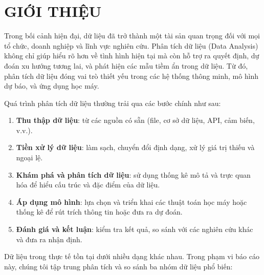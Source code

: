 ﻿\chapter{GIỚI THIỆU}

Trong bối cảnh hiện đại, dữ liệu đã trở thành một tài sản quan trọng đối với mọi tổ chức, doanh nghiệp và lĩnh vực nghiên cứu. Phân tích dữ liệu (Data Analysis) không chỉ giúp hiểu rõ hơn về tình hình hiện tại mà còn hỗ trợ ra quyết định, dự đoán xu hướng tương lai, và phát hiện các mẫu tiềm ẩn trong dữ liệu. Từ đó, phân tích dữ liệu đóng vai trò thiết yếu trong các hệ thống thông minh, mô hình dự báo, và ứng dụng học máy.

Quá trình phân tích dữ liệu thường trải qua các bước chính như sau:

\begin{enumerate}[leftmargin=1.8em,label=\textbf{(\arabic*)}]
    \item \textbf{Thu thập dữ liệu}: từ các nguồn có sẵn (file, cơ sở dữ liệu, API, cảm biến, v.v.).
    \item \textbf{Tiền xử lý dữ liệu}: làm sạch, chuyển đổi định dạng, xử lý giá trị thiếu và ngoại lệ.
    \item \textbf{Khám phá và phân tích dữ liệu}: sử dụng thống kê mô tả và trực quan hóa để hiểu cấu trúc và đặc điểm của dữ liệu.
    \item \textbf{Áp dụng mô hình}: lựa chọn và triển khai các thuật toán học máy hoặc thống kê để rút trích thông tin hoặc đưa ra dự đoán.
    \item \textbf{Đánh giá và kết luận}: kiểm tra kết quả, so sánh với các nghiên cứu khác và đưa ra nhận định.
\end{enumerate}

Dữ liệu trong thực tế tồn tại dưới nhiều dạng khác nhau. Trong phạm vi báo cáo này, chúng tôi tập trung phân tích và so sánh ba nhóm dữ liệu phổ biến:

